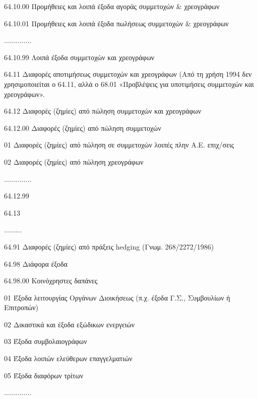 \documentclass[A4,10pt,greek]{book}
\begin{document}
                       64.10.00   Προμήθειες και λοιπά έξοδα αγοράς συμμετοχών \&
                                         χρεογράφων

                       64.10.01   Προμήθειες και λοιπά έξοδα πωλήσεως συμμετοχών \&
                                         χρεογράφων

                       ..............

                       64.10.99   Λοιπά έξοδα συμμετοχών και χρεογράφων

        64.11    Διαφορές αποτιμήσεως συμμετοχών και χρεογράφων
                    (Από τη χρήση 1994 δεν χρησιμοποιείται ο 64.11, αλλά ο 68.01
                    «Προβλέψεις για υποτιμήσεις συμμετοχών και χρεογράφων».

        64.12    Διαφορές (ζημίες) από πώληση συμμετοχών και χρεογράφων

                       64.12.00    Διαφορές (ζημίες) από πώληση συμμετοχών

                                 01    Διαφορές (ζημίες) από πώληση σε συμμετοχών λοιπές πλην
                                         Α.Ε. επιχ/σεις

                                 02    Διαφορές (ζημίες) από πώληση χρεογράφων

                       ..............

                       64.12.99

        64.13

        .........

        64.91    Διαφορές (ζημίες) από πράξεις hedging (Γνωμ. 268/2272/1986)

        64.98    Διάφορα έξοδα

                       64.98.00    Κοινόχρηστες δαπάνες

                                 01    Έξοδα λειτουργίας Οργάνων Διοικήσεως (π.χ. έξοδα Γ.Σ.,
                                         Συμβουλίων ή Επιτροπών)

                                 02    Δικαστικά και έξοδα εξώδικων ενεργειών

                                 03    Έξοδα συμβολαιογράφων

                                 04    Έξοδα λοιπών ελεύθερων επαγγελματιών

                                 05    Έξοδα διαφόρων τρίτων

                       ..............
\end{document}
